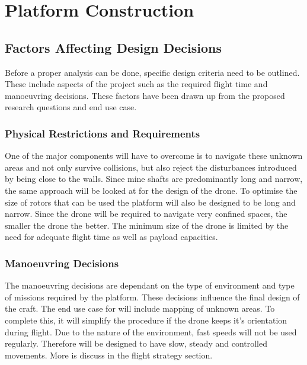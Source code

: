 	\section{Platform Construction}			
		\subsection{Factors Affecting Design Decisions}
		Before a proper analysis can be done, specific design criteria need to be outlined. These include aspects of the project such as the required flight time and manoeuvring decisions. These factors have been drawn up from the proposed research questions and end use case.
			\subsubsection{Physical Restrictions and Requirements}
			One of the major components \projectName will have to overcome is to navigate these unknown areas and not only survive collisions, but also reject the disturbances introduced by being close to the walls. Since mine shafts are predominantly long and narrow, the same approach will be looked at for the design of the drone. To optimise the size of rotors that can be used the platform will also be designed to be long and narrow. 
			Since the drone will be required to navigate very confined spaces, the smaller the drone the better. The minimum size of the drone is limited by the need for adequate flight time as well as payload capacities.
			
			\subsubsection{Manoeuvring Decisions}
			The manoeuvring decisions are dependant on the type of environment and type of missions required by the platform. These decisions influence the final design of the craft.
			The end use case for \projectName will include mapping of unknown areas. To complete this, it will simplify the procedure if the drone keeps it's orientation during flight. Due to the nature of the environment, fast speeds will not be used regularly. Therefore \projectName will be designed to have slow, steady and controlled movements. More is discuss in the flight strategy section.
			
